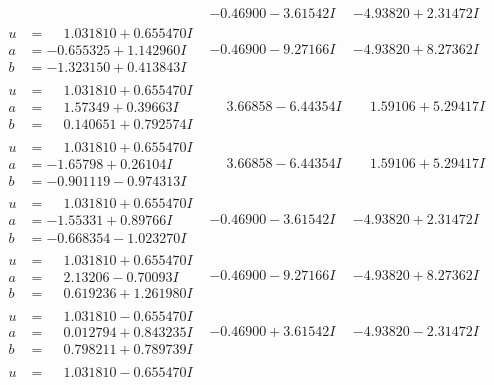 \documentclass[1p]{elsarticle_modified}
\theoremstyle{definition}
\begin{document}
$$\begin{array}{c|c|c}
 & -0.46900 - 3.61542 I & -4.93820 + 2.31472 I \\ \hline\begin{aligned}
u &= \phantom{-}1.031810 + 0.655470 I \\
a &= -0.655325 + 1.142960 I \\
b &= -1.323150 + 0.413843 I\end{aligned}
 & -0.46900 - 9.27166 I & -4.93820 + 8.27362 I \\ \hline\begin{aligned}
u &= \phantom{-}1.031810 + 0.655470 I \\
a &= \phantom{-}1.57349 + 0.39663 I \\
b &= \phantom{-}0.140651 + 0.792574 I\end{aligned}
 & \phantom{-}3.66858 - 6.44354 I & \phantom{-}1.59106 + 5.29417 I \\ \hline\begin{aligned}
u &= \phantom{-}1.031810 + 0.655470 I \\
a &= -1.65798 + 0.26104 I \\
b &= -0.901119 - 0.974313 I\end{aligned}
 & \phantom{-}3.66858 - 6.44354 I & \phantom{-}1.59106 + 5.29417 I \\ \hline\begin{aligned}
u &= \phantom{-}1.031810 + 0.655470 I \\
a &= -1.55331 + 0.89766 I \\
b &= -0.668354 - 1.023270 I\end{aligned}
 & -0.46900 - 3.61542 I & -4.93820 + 2.31472 I \\ \hline\begin{aligned}
u &= \phantom{-}1.031810 + 0.655470 I \\
a &= \phantom{-}2.13206 - 0.70093 I \\
b &= \phantom{-}0.619236 + 1.261980 I\end{aligned}
 & -0.46900 - 9.27166 I & -4.93820 + 8.27362 I \\ \hline\begin{aligned}
u &= \phantom{-}1.031810 - 0.655470 I \\
a &= \phantom{-}0.012794 + 0.843235 I \\
b &= \phantom{-}0.798211 + 0.789739 I\end{aligned}
 & -0.46900 + 3.61542 I & -4.93820 - 2.31472 I \\ \hline\begin{aligned}
u &= \phantom{-}1.031810 - 0.655470 I \\

\end{aligned}
\end{array}$$
\end{document}
